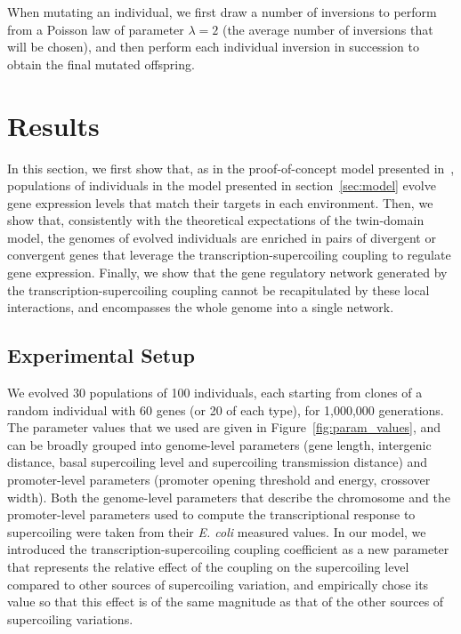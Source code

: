 When mutating an individual, we first draw a number of inversions to perform from a Poisson law of parameter $\lambda = 2$ (the average number of inversions that will be chosen), and then perform each individual inversion in succession to obtain the final mutated offspring.


\section{Results}

In this section, we first show that, as in the proof-of-concept model presented in~\citep{grohens2021}, populations of individuals in the model presented in section~\ref{sec:model} evolve gene expression levels that match their targets in each environment.
Then, we show that, consistently with the theoretical expectations of the twin-domain model, the genomes of evolved individuals are enriched in pairs of divergent or convergent genes that leverage the transcription-supercoiling coupling to regulate gene expression.
Finally, we show that the gene regulatory network generated by the transcription-supercoiling coupling cannot be recapitulated by these local interactions, and encompasses the whole genome into a single network.

\subsection{Experimental Setup}

We evolved 30 populations of 100 individuals, each starting from clones of a random individual with 60 genes (or 20 of each type), for 1,000,000 generations.
The parameter values that we used are given in Figure~\ref{fig:param_values}, and can be broadly grouped into genome-level parameters (gene length, intergenic distance, basal supercoiling level and supercoiling transmission distance) and promoter-level parameters (promoter opening threshold and energy, crossover width).
Both the genome-level parameters that describe the chromosome and the promoter-level parameters used to compute the transcriptional response to supercoiling were taken from their \emph{E. coli} measured values.
In our model, we introduced the transcription-supercoiling coupling coefficient as a new parameter that represents the relative effect of the coupling on the supercoiling level compared to other sources of supercoiling variation, and empirically chose its value so that this effect is of the same magnitude as that of the other sources of supercoiling variations.

